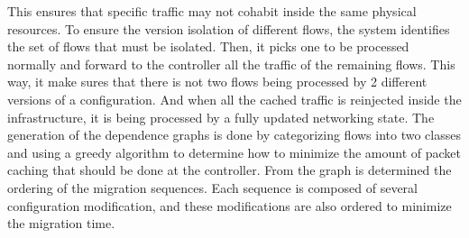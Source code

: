 This ensures that specific traffic may not cohabit inside the same physical resources.
To ensure the version isolation of different flows, the system identifies the set of flows that must be isolated. Then, it picks one to be processed normally and forward to the controller all the traffic of the remaining flows. This way, it make sures that there is not two flows being processed by 2 different versions of a configuration. And when all the cached traffic is reinjected inside the infrastructure, it is being processed by a fully updated networking state.
The generation of the dependence graphs is done by categorizing flows into two classes and using a greedy algorithm to determine how to minimize the amount of packet caching that should be done at the controller.
From the graph is determined the ordering of the migration sequences. Each sequence is composed of several configuration modification, and these modifications are also ordered to minimize the migration time. 

